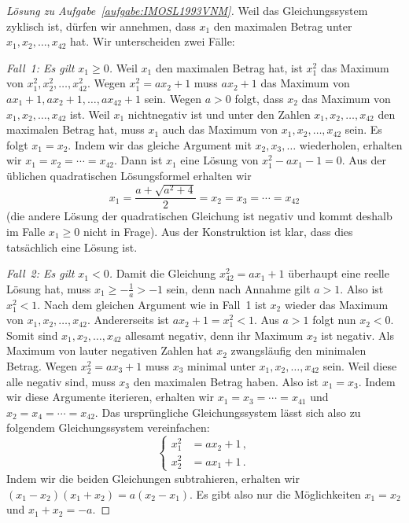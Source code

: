 \begin{proof}[Lösung zu Aufgabe~\ref{aufgabe:IMOSL1993VNM}]
	Weil das Gleichungssystem zyklisch ist, dürfen wir annehmen, dass $x_1$ den maximalen Betrag unter~$x_1,x_2,\dotsc,x_{42}$ hat. Wir unterscheiden zwei Fälle:
	
	\emph{Fall~1: Es gilt $x_1\geqslant 0$.} Weil $x_1$ den maximalen Betrag hat, ist $x_1^2$ das Maximum von $x_1^2,x_2^2,\dotsc,x_{42}^2$. Wegen $x_1^2=ax_2+1$ muss $ax_2+1$ das Maximum von $ax_1+1,ax_2+1,\dotsc,ax_{42}+1$ sein. Wegen $a>0$ folgt, dass $x_2$ das Maximum von $x_1,x_2,\dotsc,x_{42}$ ist. Weil $x_1$ nichtnegativ ist und unter den Zahlen $x_1,x_2,\dotsc,x_{42}$ den maximalen Betrag hat, muss $x_1$ auch das Maximum von $x_1,x_2,\dotsc,x_{42}$ sein. Es folgt $x_1=x_2$. Indem wir das gleiche Argument mit $x_2,x_3,\dotsc$ wiederholen, erhalten wir $x_1=x_2=\dotsb=x_{42}$. Dann ist $x_1$ eine Lösung von $x_1^2-ax_1-1=0$. Aus der üblichen quadratischen Lösungsformel erhalten wir
	\begin{equation*}
		x_1=\frac{a+\sqrt{a^2+4}}2=x_2=x_3=\dotsb=x_{42}
	\end{equation*}
	(die andere Lösung der quadratischen Gleichung ist negativ und kommt deshalb im Falle $x_1\geqslant 0$ nicht in Frage). Aus der Konstruktion ist klar, dass dies tatsächlich eine Lösung ist.
	
	\emph{Fall~2: Es gilt $x_1<0$.} Damit die Gleichung $x_{42}^2=ax_1+1$ überhaupt eine reelle Lösung hat, muss $x_1\geqslant -\frac 1a>-1$ sein, denn nach Annahme gilt $a>1$. Also ist $x_1^2<1$. Nach dem gleichen Argument wie in Fall~1 ist $x_2$ wieder das Maximum von $x_1,x_2,\dotsc,x_{42}$. Andererseits ist $ax_2+1=x_1^2<1$. Aus $a>1$ folgt nun $x_2<0$. Somit sind $x_1,x_2,\dotsc,x_{42}$ allesamt negativ, denn ihr Maximum $x_2$ ist negativ. Als Maximum von lauter negativen Zahlen hat $x_2$ zwangsläufig den minimalen Betrag. Wegen $x_2^2=ax_3+1$ muss $x_3$ minimal unter $x_1,x_2,\dotsc,x_{42}$ sein. Weil diese alle negativ sind, muss $x_3$ den maximalen Betrag haben. Also ist $x_1=x_3$. Indem wir diese Argumente iterieren, erhalten wir $x_1=x_3=\dotsb=x_{41}$ und $x_2=x_4=\dotsb=x_{42}$. Das ursprüngliche Gleichungssystem lässt sich also zu folgendem Gleichungssystem vereinfachen:
	\begin{equation*}
		\left\{\begin{aligned}
			x_1^2&=ax_2+1\,,\\
			x_2^2&=ax_1+1\,.
		\end{aligned}\right.
	\end{equation*}
	Indem wir die beiden Gleichungen subtrahieren, erhalten wir $(x_1-x_2)(x_1+x_2)=a(x_2-x_1)$. Es gibt also nur die Möglichkeiten $x_1=x_2$ und $x_1+x_2=-a$. 
	

\end{proof}
